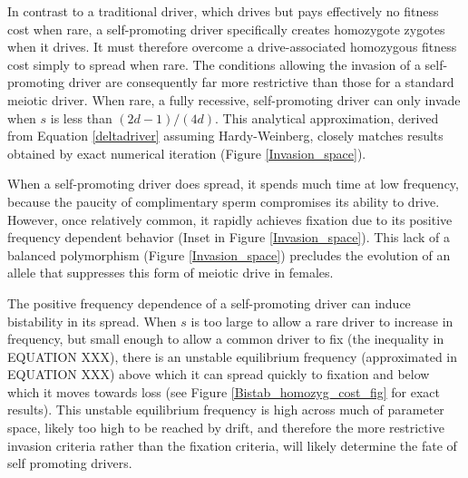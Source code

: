 \documentclass[12pt,letterpaper]{article}
\newcommand{\yb}[1]{{ \color{blue} #1}}
\begin{document}
In contrast to a traditional driver, which drives but pays effectively
	no fitness cost when rare, 
	a self-promoting driver specifically creates homozygote
        zygotes when it drives. %
It must therefore overcome a drive-associated homozygous fitness cost simply to spread when rare. 
The conditions allowing the invasion of a self-promoting driver
 	are consequently far more restrictive than those for a standard meiotic driver.
When rare, a fully recessive, self-promoting driver can only invade when $s$ 
	is less than $(2 d - 1)/(4 d)$. 
This analytical approximation, derived from Equation \eqref{deltadriver} assuming Hardy-Weinberg, 
	closely matches results obtained by exact numerical iteration (Figure \ref{Invasion_space}). 


When a self-promoting driver does spread, 
	it spends much time at low frequency, 
	because the paucity of complimentary sperm compromises its ability to drive. 
However, once relatively common, it  rapidly achieves fixation due to its
	positive frequency dependent behavior (Inset in Figure \ref{Invasion_space}).  
This lack of a balanced polymorphism (Figure \ref{Invasion_space}) precludes the evolution of an
	allele that suppresses this form of meiotic drive in females.


\yb{
The positive frequency dependence of a self-promoting driver can
induce bistability in its spread.
When $s$ is too large to allow a rare driver to increase in frequency, but small enough to allow a common driver to fix (the inequality in EQUATION XXX),
there is  an unstable equilibrium frequency (approximated in EQUATION XXX)  
	above which it can spread quickly to fixation and below which it moves towards loss 
	(see Figure \ref{Bistab_homozyg_cost_fig} for exact results).	
This unstable equilibrium frequency is high across much of
	parameter space, likely too high to be reached by drift, 
	and therefore the more restrictive invasion criteria rather than the fixation criteria, will  likely determine the fate of self promoting drivers. 
}
\end{document}
